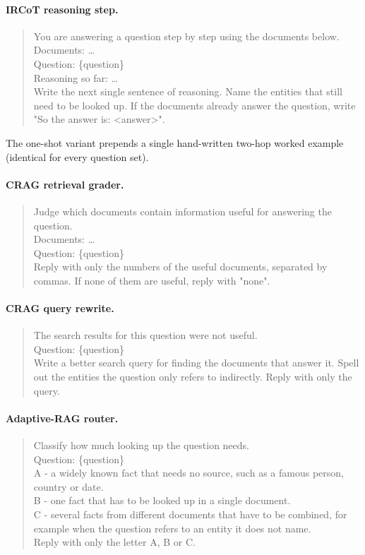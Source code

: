 \paragraph{IRCoT reasoning step.}
\begin{quote}\small\ttfamily\raggedright
You are answering a question step by step using the documents below.\\[2pt]
Documents: \ldots\\
Question: \{question\}\\
Reasoning so far: \ldots\\[2pt]
Write the next single sentence of reasoning. Name the entities that still
need to be looked up. If the documents already answer the question, write
"So the answer is: <answer>".
\end{quote}
The one-shot variant prepends a single hand-written two-hop worked example
(identical for every question set).

\paragraph{CRAG retrieval grader.}
\begin{quote}\small\ttfamily\raggedright
Judge which documents contain information useful for answering the
question.\\[2pt]
Documents: \ldots\\
Question: \{question\}\\[2pt]
Reply with only the numbers of the useful documents, separated by commas.
If none of them are useful, reply with "none".
\end{quote}

\paragraph{CRAG query rewrite.}
\begin{quote}\small\ttfamily\raggedright
The search results for this question were not useful.\\[2pt]
Question: \{question\}\\[2pt]
Write a better search query for finding the documents that answer it.
Spell out the entities the question only refers to indirectly. Reply with
only the query.
\end{quote}

\paragraph{Adaptive-RAG router.}
\begin{quote}\small\ttfamily\raggedright
Classify how much looking up the question needs.\\[2pt]
Question: \{question\}\\[2pt]
A - a widely known fact that needs no source, such as a famous person,
country or date.\\
B - one fact that has to be looked up in a single document.\\
C - several facts from different documents that have to be combined, for
example when the question refers to an entity it does not name.\\[2pt]
Reply with only the letter A, B or C.
\end{quote}

